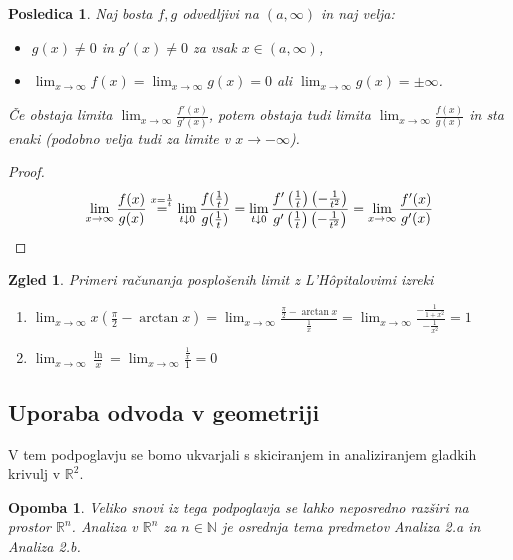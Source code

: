 \documentclass[10pt, a4paper]{article}
\newtheorem{posledica}[izr]{Posledica}
\newtheorem*{opomba}{Opomba}
\newtheorem{zgled}{Zgled}[section]
\newenvironment{noticeC}{%
  \tcolorbox[%
  notitle,
  empty,
  enhanced,  %
  breakable,
  coltext=black, 
  fontupper=\rmfamily,
  parbox=false,
  noparskip,
  sharp corners,
  boxrule=-1pt,  %
  frame hidden,
  left=7pt,  %
  right=7pt,
  top=5pt,
  bottom=5pt,
  before skip=2.5ex plus 2pt,
  after skip=2.5ex plus 2pt,
  overlay unbroken and last={%
  },
  ]}
{\endtcolorbox}
\newenvironment{dokaz}%
  {\begin{noticeC}\begin{proof}}%
  {\end{proof}\end{noticeC}}
\newcommand{\N}{\mathbb {N}}
\newcommand{\R}{\mathbb {R}}
\newcommand{\limf}[3]{\lim_{#1 \to #2} {#3}}
\newcommand{\rlimf}[3]{\lim_{#1 \downarrow #2} {#3}}
\begin{document}
\begin{posledica}
    Naj bosta $f,g$ odvedljivi na $(a, \infty)$ in naj velja:
    \begin{itemize}
        \item $g(x) \neq 0$ in $g'(x) \neq 0$ za vsak $x \in (a,\infty)$,
        \item $\displaystyle \limf{x}{\infty}{f(x)} = \limf{x}{\infty}{g(x)} = 0$ ali $\limf{x}{\infty}{g(x)} = \pm \infty$.
    \end{itemize}
    Če obstaja limita $\limf{x}{\infty}{\frac{f'(x)}{g'(x)}}$, potem obstaja tudi limita $\limf{x}{\infty}{\frac{f(x)}{g(x)}}$ in sta enaki (podobno velja tudi za limite v $x \rightarrow - \infty$).
\end{posledica}
    
\begin{dokaz}
    \begin{equation*}
        \limf{x}{\infty}{\frac{f(x)}{g(x)}} \stackrel{x = \frac{1}{t}}{=} \rlimf{t}{0}{\frac{f(\frac{1}{t})}{g(\frac{1}{t})}} = \rlimf{t}{0}{\frac{f' \left(\frac{1}{t} \right) \left(- \frac{1}{t^2} \right)}{g' \left(\frac{1}{t} \right) \left(- \frac{1}{t^2} \right)}} = \limf{x}{\infty}{\frac{f'(x)}{g'(x)}} \qedhere
    \end{equation*}
\end{dokaz}
\clearpage
    \begin{zgled}
    Primeri računanja posplošenih limit z L'Hôpitalovimi izreki
    \begin{enumerate}
        \item $\displaystyle \limf{x}{\infty}{x \left(\frac{\pi}{2} - \arctan x\right)} = \limf{x}{\infty}{\frac{\frac{\pi}{2} - \arctan x}{\frac{1}{x}}} = \limf{x}{\infty}{\frac{- \frac{1}{1 + x^2}}{- \frac{1}{x^2}}} = 1$
        \item $\displaystyle \limf{x}{\infty}{\frac{\ln}{x}} = \limf{x}{\infty}{\frac{\frac{1}{x}}{1}} = 0$
    \end{enumerate}
\end{zgled}

\subsection{Uporaba odvoda v geometriji}

V tem podpoglavju se bomo ukvarjali s skiciranjem in analiziranjem gladkih krivulj v $\R^2.$

\begin{opomba}
    Veliko snovi iz tega podpoglavja se lahko neposredno razširi na prostor $\R^n$.
    Analiza v $\R^n$ za $n \in \N$ je osrednja tema predmetov Analiza 2.a in Analiza 2.b.
\end{opomba}
\end{document}
